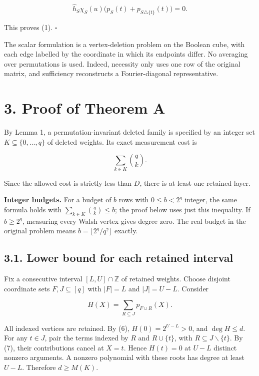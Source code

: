 \documentclass[
  10pt,
]{article}
\begin{document}
\[
 \widehat h_S\chi_S(u)\bigl(p_S(t)+p_{S\triangle\{t\}}(t)\bigr)=0.
\]

This proves (1). \(\square\)

The scalar formulation is a vertex-deletion problem on the Boolean cube, with each edge labelled by the coordinate in which its endpoints differ. No averaging over permutations is used. Indeed, necessity only uses one row of the original matrix, and sufficiency reconstructs a Fourier-diagonal representative.

\section{3. Proof of Theorem A}\label{proof-of-theorem-a}

By Lemma 1, a permutation-invariant deleted family is specified by an integer set \(K\subseteq\{0,\ldots,q\}\) of deleted weights. Its exact measurement cost is

\[
 \sum_{k\in K}\binom qk.
\]

Since the allowed cost is strictly less than \(D\), there is at least one retained layer.

\textbf{Integer budgets.} For a budget of \(b\) rows with \(0\le b<2^q\) integer, the same formula holds with \(\sum_{k\in K}\binom{q}{k}\le b\); the proof below uses just this inequality. If \(b\ge2^q\), measuring every Walsh vertex gives degree zero. The real budget in the original problem means \(b=\lfloor 2^q/q^\gamma\rfloor\) exactly.

\subsection{3.1. Lower bound for each retained interval}\label{lower-bound-for-each-retained-interval}

Fix a consecutive interval \([L,U]\cap\mathbb Z\) of retained weights. Choose disjoint coordinate sets \(F,J\subseteq[q]\) with \(|F|=L\) and \(|J|=U-L\). Consider

\[
 H(X)=\sum_{R\subseteq J}p_{F\cup R}(X).
\]

All indexed vertices are retained. By (6), \(H(0)=2^{U-L}>0\), and \(\deg H\le d\). For any \(t\in J\), pair the terms indexed by \(R\) and \(R\cup\{t\}\), with \(R\subseteq J\mathbin{\backslash}\{t\}\). By (7), their contributions cancel at \(X=t\). Hence \(H(t)=0\) at \(U-L\) distinct nonzero arguments. A nonzero polynomial with these roots has degree at least \(U-L\). Therefore \(d\ge M(K)\).
\end{document}

